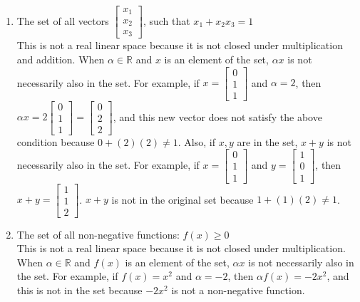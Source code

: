 \documentclass[11pt]{amsart}
\theoremstyle{plain}
\theoremstyle{definition}
\begin{document}
\begin{enumerate}
\begin{enumerate}
\item The set of all vectors $\left[\begin{array}{c}
x_{1}\\
x_{2}\\
x_{3}
\end{array}\right]$, such that $x_{1}+x_{2}x_{3}=1$ \\
This is not a real linear space because it is not closed under multiplication and addition. When $\alpha \in \mathbb{R}$ and $x$ is an element of the set, $\alpha x$ is not necessarily also in the set. For example, if $x = \begin{bmatrix} 0 \\ 1 \\ 1 \end{bmatrix}$ and $\alpha = 2$, then $\alpha x = 2 \begin{bmatrix} 0 \\ 1 \\ 1 \end{bmatrix} = \begin{bmatrix} 0 \\ 2 \\ 2 \end{bmatrix}$, and this new vector does not satisfy the above condition because $0 + (2)(2) \neq 1$. Also, if $x, y$ are in the set, $x + y$ is not necessarily also in the set. For example, if $x = \begin{bmatrix} 0 \\ 1 \\ 1 \end{bmatrix}$ and $y = \begin{bmatrix} 1 \\ 0 \\ 1 \end{bmatrix}$, then $x + y = \begin{bmatrix} 1 \\ 1 \\ 2 \end{bmatrix}$. $x + y$ is not in the original set because $1 + (1)(2) \neq 1$. \\

\item The set of all non-negative functions: $f(x)\geq0$ \\
This is not a real linear space because it is not closed under multiplication. When $\alpha \in \mathbb{R}$ and $f(x)$ is an element of the set, $\alpha x$ is not necessarily also in the set. For example, if $f(x) = x^2$ and $\alpha = -2$, then $\alpha f(x) = -2x^2$, and this is not in the set because $-2x^2$ is not a non-negative function. \\


\end{enumerate}
\end{enumerate}
\end{document}
